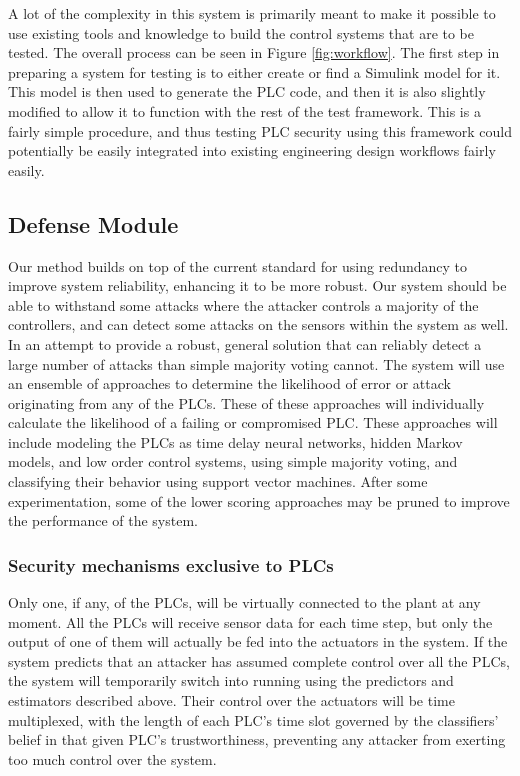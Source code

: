 \documentclass[10pt,twocolumn]{IEEEtran}
\begin{document}
A lot of the complexity in this system is primarily meant to make it possible to use existing tools and knowledge to build the control systems that are to be tested.
The overall process can be seen in Figure \ref{fig:workflow}.
The first step in preparing a system for testing is to either create or find a Simulink model for it.
This model is then used to generate the PLC code, and then it is also slightly modified to allow it to function with the rest of the test framework.
This is a fairly simple procedure, and thus testing PLC security using this framework could potentially be easily integrated into existing engineering design workflows fairly easily.

\subsection{Defense Module} \label{sec:def}
Our method builds on top of the current standard for using redundancy to improve system reliability, enhancing it to be more robust.
Our system should be able to withstand some attacks where the attacker controls a majority of the controllers, and can detect some attacks on the sensors within the system as well.
In an attempt to provide a robust, general solution that can reliably detect a large number of attacks than simple majority voting cannot.
The system will use an ensemble of approaches to determine the likelihood of error or attack originating from any of the PLCs.
These of these approaches will individually calculate the likelihood of a failing or compromised PLC.
These approaches will include modeling the PLCs as time delay neural networks, hidden Markov models, and low order control systems, using simple majority voting, and classifying their behavior using support vector machines.
After some experimentation, some of the lower scoring approaches may be pruned to improve the performance of the system.

\subsubsection{Security mechanisms exclusive to PLCs}
Only one, if any, of the PLCs, will be virtually connected to the plant at any moment.
All the PLCs will receive sensor data for each time step, but only the output of one of them will actually be fed into the actuators in the system.
If the system predicts that an attacker has assumed complete control over all the PLCs, the system will temporarily switch into running using the predictors and estimators described above.
Their control over the actuators will be time multiplexed, with the length of each PLC's time slot governed by the classifiers' belief in that given PLC's trustworthiness, preventing any attacker from exerting too much control over the system.
\end{document}
